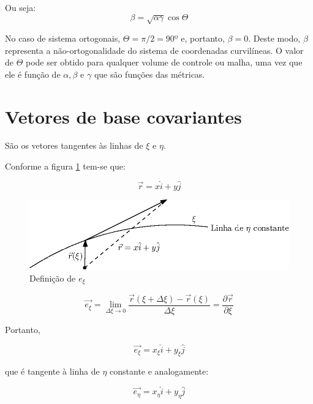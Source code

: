 Ou seja:
\begin{equation}
    \label{eq:3.21}
    \beta = \sqrt{\alpha \gamma}\cos{\Theta}
\end{equation}

No caso de sistema ortogonais, $\Theta = \pi/2 = 90º$ e, portanto, $\beta = 0$. Deste modo, $\beta$ representa a não-ortogonalidade do sistema de coordenadas curvilíneas. O valor de $\Theta$ pode ser obtido para qualquer volume de controle ou malha, uma vez que ele é função de $\alpha, \beta$ e $\gamma$ que são funções das métricas.

\section{Vetores de base covariantes}
São os vetores tangentes às linhas de $\xi$ e $\eta$.

Conforme a figura \ref{fig:e_xi} tem-se que:

\begin{equation}
    \label{eq:3.22}
    \vec{r} = x \hat{i} + y \hat{j}
\end{equation}

\begin{figure}[h]
    \centering
    \includegraphics{fig/e_xi.eps}
    \caption{Definição de $e_\xi$}
    \label{fig:e_xi}
\end{figure}

\begin{equation}
    \label{eq:3.23}
    \vec{e_\xi} = \lim_{\Delta \xi \to 0} \frac{\vec{r}(\xi + \Delta \xi) - \vec{r}(\xi)}{\Delta \xi} = \frac{\partial \vec{r}}{\partial \xi}
\end{equation}

Portanto,

\begin{equation}
    \label{eq:3.24}
    \vec{e_\xi} = x_\xi \hat{i} + y_\xi \hat{j}
\end{equation}

que é tangente à linha de $\eta$ constante e analogamente:

\begin{equation}
    \label{eq:3.25}
    \vec{e_\eta} = x_\eta \hat{i} + y_\eta \hat{j}
\end{equation}

